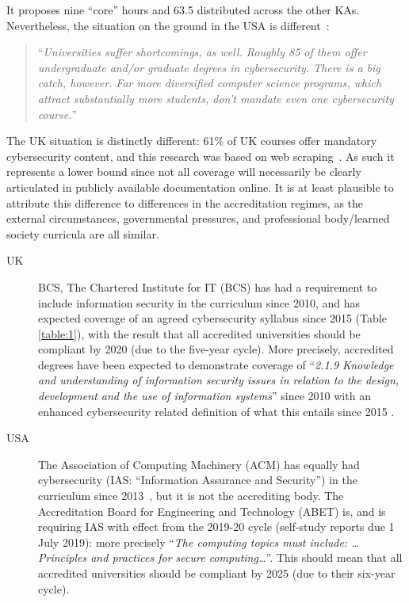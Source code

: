 \documentclass[conference]{IEEEtran}
\begin{document}
It proposes nine ``core'' hours and 63.5 distributed across the other KAs. Nevertheless, the situation on the ground in the USA is different~\cite{Ackerman2019a}:

\begin{quote}
``{\emph{Universities suffer shortcomings, as well. Roughly 85 of them offer undergraduate and/or graduate degrees in cybersecurity. There is a big catch, however. Far more diversified computer science programs, which attract substantially more students, don't mandate even one cybersecurity course.}}''
\end{quote}

The UK situation is distinctly different: 61\% of UK courses offer mandatory cybersecurity content, and this research was based on web scraping~\cite[Table 1]{Ruiz2019a}. As such it represents a lower bound since not all coverage will necessarily be clearly articulated in publicly available documentation online. It is at least plausible to attribute this difference to differences in the accreditation regimes, as the external circumstances, governmental pressures, and professional body/learned society curricula are all similar.

\begin{description}
\item[UK] BCS, The Chartered Institute for IT (BCS) has had a requirement to include information security in the curriculum since 2010, and has expected coverage of an agreed cybersecurity syllabus since 2015 (Table \ref{table:1}), with the result that all accredited universities should be compliant by 2020 (due to the five-year cycle). More precisely, accredited degrees have been expected to demonstrate coverage of ``{\emph{2.1.9 Knowledge and understanding of information security issues in relation to the design, development and the use of information systems}}'' \cite[p.~30]{BCS2018a} since 2010 with an enhanced cybersecurity related definition of what this entails since 2015 \cite[p.~17--18]{BCS2018a}.
\item[USA] The Association of Computing Machinery (ACM) has equally had cybersecurity (IAS: ``Information Assurance and Security'') in the curriculum since 2013~\cite{ACM2013a}, but it is not the accrediting body. The Accreditation Board for Engineering and Technology (ABET) is, and is requiring IAS with effect from the 2019-20 cycle (self-study reports due 1 July 2019): more precisely \cite[Table 3]{Oudshoornetal2018a} ``{\emph{The computing topics must include: \dots{} Principles and practices for secure computing\dots}}''. This should mean that  all accredited universities should be compliant by 2025 (due to their six-year cycle).
\end{description}
\end{document}
